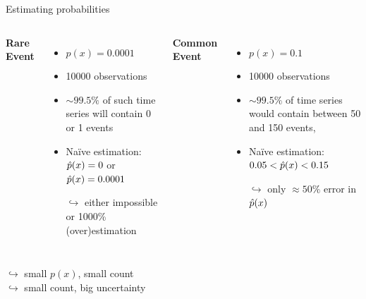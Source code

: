 \begin{frame}{Estimating probabilities}
\begin{columns}[T]
\textbf{Rare Event} %
\begin{itemize}
  \item $p(x) = 0.0001$
  \item \num{10000} observations
  \item $\sim 99.5\%$ of such time series will contain 0 or 1 events
  \item Na\"ive estimation: $\hat{p}(x) = 0$ or $\hat{p}(x)=0.0001$
  \item[$\hookrightarrow$] either impossible or 1000\% (over)estimation
\end{itemize}
\textbf{Common Event} %
\begin{itemize}
  \item $p(x)=0.1$
  \item \num{10000} observations
  \item $\sim 99.5\%$ of time series would contain between 50 and 150 events,
  \item Na\"ive estimation: $0.05< \hat{p}(x) <0.15$
  \item[]
  \item[$\hookrightarrow$] only $\approx 50\%$ error in $\hat{p}(x)$
\end{itemize}
\end{columns}
\vspace{2em}
 \centering
$\hookrightarrow$ small $p(x)$, small count \\
$\hookrightarrow$ small count, big uncertainty
\end{frame}


